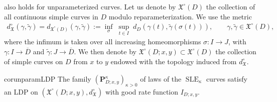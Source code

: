 \documentclass[a4paper, 11pt]{article}
\theoremstyle{definition}
\numberwithin{equation}{section}
\numberwithin{figure}{section}
\newcommand{\SLE}[1][]{\operatorname{SLE}_{#1}}
\newcommand{\lenergy}[2]{I_{#1;#2}}
\newcommand{\Xpaths}[1][]{\mathfrak{X}_{#1}}
\newcommand{\unparampaths}{\Xpaths[]^\circ}%
\newcommand{\dXpathsUnparam}{d_{\Xpaths}^\circ}%
\newcommand{\SLEmeasure}[2]{\mathbf{P}^{#2}_{\!\!#1}}
\begin{document}
 also holds for unparameterized curves. 
Let us denote by $\unparampaths(D)$ the collection of all continuous simple 
curves in $D$ modulo reparameterization. 
We use the metric 
\begin{align*}
\dXpathsUnparam(\gamma, \tilde{\gamma} ) 
= d_{\unparampaths(D)}(\gamma, \tilde{\gamma} ) 
:= \inf_{\sigma} \; \sup_{t \in I} \; d_D(\gamma(t),\tilde{\gamma}(\sigma(t)))
, \qquad \gamma, \tilde{\gamma}  \in \unparampaths(D) ,
\end{align*}
where the infimum is taken over all increasing homeomorphisms $\sigma \colon I \to J$,
with $\gamma \colon I \to \overline{D}$ and $\tilde{\gamma} \colon J \to \overline{D}$. 
We then denote by $\unparampaths(D;x,y) \subset \unparampaths(D)$ the collection of simple curves on $D$ from $x$ to $y$ 
endowed with the topology induced from $\dXpathsUnparam$. 

\begin{restatable}{cor}{unparamLDP}\label{cor:unparam_LDP}
The family $(\SLEmeasure{D;x,y}{\kappa})_{\kappa > 0}$ of laws of the $\SLE[\kappa]$ curves 
satisfy an LDP on $(\unparampaths(D;x,y),\dXpathsUnparam)$ 
with good rate function $\lenergy{D}{x,y}$. 
\end{restatable}
\end{document}
